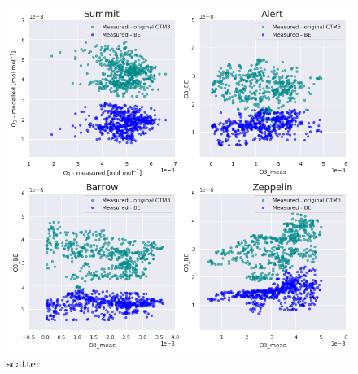 \begin{figure}[h]
    \centering
    \includegraphics[width = \linewidth]{Chapter6_Results/images/scatter_april_june.png}
    \caption{scatter}
    \label{fig:scatter_AprMay}
\end{figure}